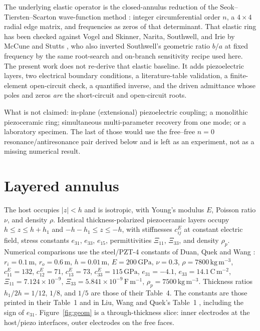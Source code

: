 \documentclass[11pt]{article}
\begin{document}
The underlying elastic operator is the closed-annulus reduction of the
Seok--Tiersten--Scarton wave-function method \cite{seok1,seok2,seok3,seok4}:
integer circumferential order $n$, a $4\times4$ radial edge matrix, and
frequencies as zeros of that determinant. That elastic ring has been
checked against Vogel and Skinner, Narita, Southwell, and Irie by
McCune and Stutts \cite{mccune2026ring}, who also inverted Southwell's
geometric ratio $b/a$ at fixed frequency by the same root-search and
on-branch sensitivity recipe used here. The present work does not
re-derive that elastic baseline. It adds piezoelectric layers, two
electrical boundary conditions, a literature-table validation, a
finite-element open-circuit check, a quantified inverse, and the driven
admittance whose poles and zeros \emph{are} the short-circuit and
open-circuit roots.

What is not claimed: in-plane (extensional) piezoelectric coupling; a
monolithic piezoceramic ring; simultaneous multi-parameter recovery from
one mode; or a laboratory specimen. The last of those would use the
free--free $n=0$ resonance/antiresonance pair derived below and is left
as an experiment, not as a missing numerical result.

\section{Layered annulus}\label{sec:const}
The host occupies $|z|<h$ and is isotropic, with Young's modulus $E$,
Poisson ratio $\nu$, and density $\rho$. Identical thickness-polarized
piezoceramic layers occupy $h\le z\le h+h_1$ and $-h-h_1\le z\le -h$,
with stiffnesses $c_{ij}^E$ at constant electric field, stress constants
$e_{31}$, $e_{33}$, $e_{15}$, permittivities $\Xi_{11}$, $\Xi_{33}$, and
density $\rho_p$. Numerical comparisons use the steel/PZT-4 constants of
Duan, Quek and Wang \cite{duan2005}: $r_i=0.1\,\mathrm{m}$,
$r_o=0.6\,\mathrm{m}$, $h=0.01\,\mathrm{m}$, $E=200\,\mathrm{GPa}$,
$\nu=0.3$, $\rho=7800\,\mathrm{kg\,m^{-3}}$, $c_{11}^E=132$,
$c_{12}^E=71$, $c_{13}^E=73$, $c_{33}^E=115\,\mathrm{GPa}$,
$e_{31}=-4.1$, $e_{33}=14.1\,\mathrm{C\,m^{-2}}$,
$\Xi_{11}=7.124\times10^{-9}$, $\Xi_{33}=5.841\times10^{-9}\,\mathrm{F\,m^{-1}}$,
$\rho_p=7500\,\mathrm{kg\,m^{-3}}$. Thickness ratios $h_1/2h=1/12$,
$1/8$, and $1/5$ are those of their Table~4. The constants are those
printed in their Table~1 and in Liu, Wang and Quek's Table~1
\cite{liu2002}, including the sign of $e_{31}$. Figure~\ref{fig:geom} is a
through-thickness slice: inner electrodes at the host/piezo interfaces,
outer electrodes on the free faces.
\end{document}
